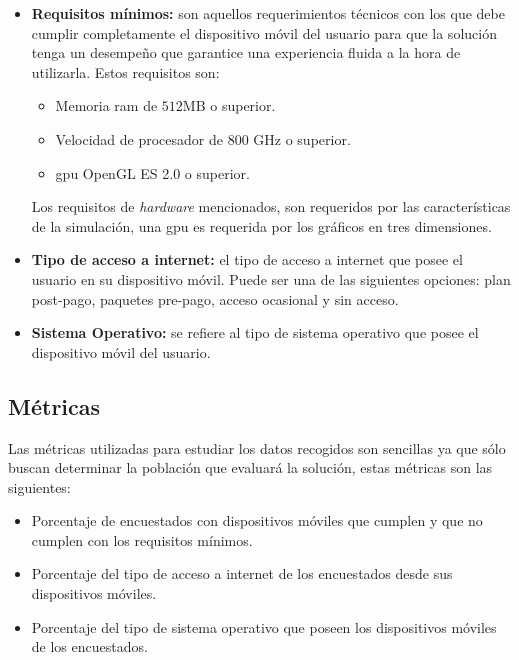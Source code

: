 \begin{itemize}

\item \textbf{Requisitos mínimos:} son aquellos requerimientos técnicos con los que 
    debe cumplir completamente el dispositivo móvil del usuario para que la 
    solución tenga un desempeño que garantice una experiencia fluida a la hora de 
    utilizarla. Estos requisitos son:
    \begin{itemize}
        \item Memoria ram de $512$MB o superior.
        \item Velocidad de procesador de $800$ GHz o superior.
        \item \Gls{gpu} OpenGL ES 2.0 o superior.
    \end{itemize}
    Los requisitos de \textit{hardware} mencionados, son requeridos por las
    características de la simulación, una \Gls{gpu} es requerida por los gráficos en 
    tres dimensiones.

\item \textbf{Tipo de acceso a internet:} el tipo de acceso a internet que posee el 
    usuario en su dispositivo móvil. Puede ser una de las siguientes opciones:
    plan post-pago, paquetes pre-pago, acceso ocasional y sin acceso.
    
\item \textbf{Sistema Operativo:} se refiere al tipo de sistema operativo que posee 
    el dispositivo móvil del usuario.

    
\end{itemize}

\subsection{Métricas}

Las métricas utilizadas para estudiar los datos recogidos son sencillas ya que
sólo buscan determinar la población que evaluará la solución, estas métricas son
las siguientes:

\begin{itemize}
\item Porcentaje de encuestados con dispositivos móviles que cumplen y que no cumplen con 
los requisitos mínimos.
\item Porcentaje del tipo de acceso a internet de los encuestados desde sus dispositivos móviles.
\item Porcentaje del tipo de sistema operativo que poseen los dispositivos móviles de los 
encuestados.
\end{itemize}


